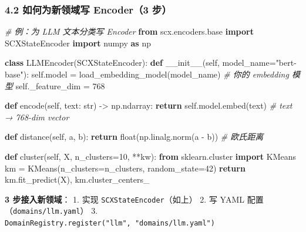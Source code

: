 \documentclass[
  12pt,
]{ctexart}
\newenvironment{Shaded}{}{}
\newcommand{\BuiltInTok}[1]{\textcolor[rgb]{0.00,0.50,0.00}{#1}}
\newcommand{\CommentTok}[1]{\textcolor[rgb]{0.38,0.63,0.69}{\textit{#1}}}
\newcommand{\ControlFlowTok}[1]{\textcolor[rgb]{0.00,0.44,0.13}{\textbf{#1}}}
\newcommand{\DecValTok}[1]{\textcolor[rgb]{0.25,0.63,0.44}{#1}}
\newcommand{\FunctionTok}[1]{\textcolor[rgb]{0.02,0.16,0.49}{#1}}
\newcommand{\ImportTok}[1]{\textcolor[rgb]{0.00,0.50,0.00}{\textbf{#1}}}
\newcommand{\KeywordTok}[1]{\textcolor[rgb]{0.00,0.44,0.13}{\textbf{#1}}}
\newcommand{\NormalTok}[1]{#1}
\newcommand{\OperatorTok}[1]{\textcolor[rgb]{0.40,0.40,0.40}{#1}}
\newcommand{\StringTok}[1]{\textcolor[rgb]{0.25,0.44,0.63}{#1}}
\newcommand{\VariableTok}[1]{\textcolor[rgb]{0.10,0.09,0.49}{#1}}
\begin{document}
\subsubsection{4.2 如何为新领域写 Encoder（3
步）}\label{ux5982ux4f55ux4e3aux65b0ux9886ux57dfux5199-encoder3-ux6b65}

\begin{Shaded}
\begin{Highlighting}[]
\CommentTok{\# 例：为 LLM 文本分类写 Encoder}
\ImportTok{from}\NormalTok{ scx.encoders.base }\ImportTok{import}\NormalTok{ SCXStateEncoder}
\ImportTok{import}\NormalTok{ numpy }\ImportTok{as}\NormalTok{ np}

\KeywordTok{class}\NormalTok{ LLMEncoder(SCXStateEncoder):}
    \KeywordTok{def} \FunctionTok{\_\_init\_\_}\NormalTok{(}\VariableTok{self}\NormalTok{, model\_name}\OperatorTok{=}\StringTok{"bert{-}base"}\NormalTok{):}
        \VariableTok{self}\NormalTok{.model }\OperatorTok{=}\NormalTok{ load\_embedding\_model(model\_name)  }\CommentTok{\# 你的 embedding 模型}
        \VariableTok{self}\NormalTok{.\_feature\_dim }\OperatorTok{=} \DecValTok{768}

    \KeywordTok{def}\NormalTok{ encode(}\VariableTok{self}\NormalTok{, text: }\BuiltInTok{str}\NormalTok{) }\OperatorTok{{-}\textgreater{}}\NormalTok{ np.ndarray:}
        \ControlFlowTok{return} \VariableTok{self}\NormalTok{.model.embed(text)  }\CommentTok{\# text → 768{-}dim vector}

    \KeywordTok{def}\NormalTok{ distance(}\VariableTok{self}\NormalTok{, a, b):}
        \ControlFlowTok{return} \BuiltInTok{float}\NormalTok{(np.linalg.norm(a }\OperatorTok{{-}}\NormalTok{ b))  }\CommentTok{\# 欧氏距离}

    \KeywordTok{def}\NormalTok{ cluster(}\VariableTok{self}\NormalTok{, X, n\_clusters}\OperatorTok{=}\DecValTok{10}\NormalTok{, }\OperatorTok{**}\NormalTok{kw):}
        \ImportTok{from}\NormalTok{ sklearn.cluster }\ImportTok{import}\NormalTok{ KMeans}
\NormalTok{        km }\OperatorTok{=}\NormalTok{ KMeans(n\_clusters}\OperatorTok{=}\NormalTok{n\_clusters, random\_state}\OperatorTok{=}\DecValTok{42}\NormalTok{)}
        \ControlFlowTok{return}\NormalTok{ km.fit\_predict(X), km.cluster\_centers\_}
\end{Highlighting}
\end{Shaded}

\textbf{3 步接入新领域}： 1. 实现 \texttt{SCXStateEncoder}（如上） 2. 写
YAML 配置（\texttt{domains/llm.yaml}） 3.
\texttt{DomainRegistry.register("llm",\ "domains/llm.yaml")}
\end{document}
